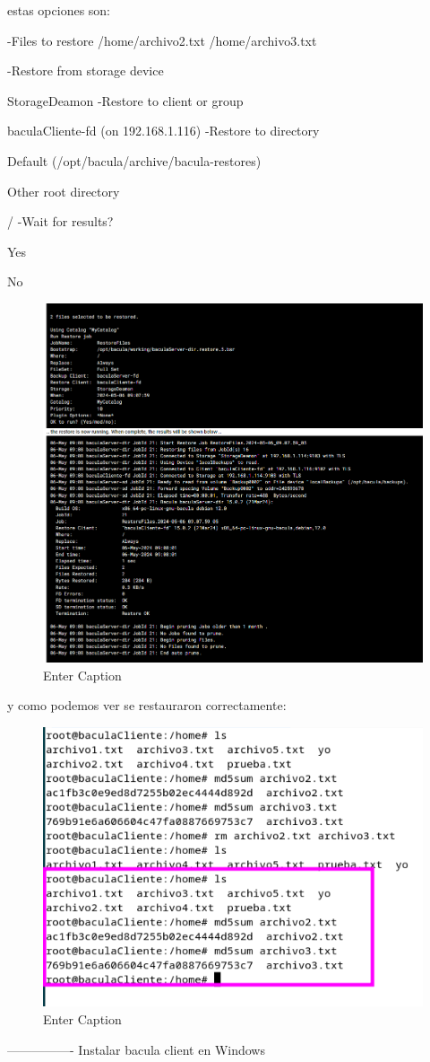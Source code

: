 estas opciones son:

-Files to restore
/home/archivo2.txt
/home/archivo3.txt
 
-Restore from storage device

StorageDeamon
-Restore to client or group

baculaCliente-fd (on 192.168.1.116)
-Restore to directory

  Default (/opt/bacula/archive/bacula-restores) 


  Other root directory 
 
/
-Wait for results?

  Yes 
 
  No 

\begin{figure}[H]
    \centering
    \includegraphics[width=0.5\linewidth]{instalacionBacula/restoresalidawebmin.png}
    \caption{Enter Caption}
\end{figure}

y como podemos ver se restauraron correctamente:
\begin{figure}[H]
    \centering
    \includegraphics[width=0.5\linewidth]{instalacionBacula/restoreSusc.png}
    \caption{Enter Caption}
\end{figure}

----------------
Instalar bacula client en Windows



